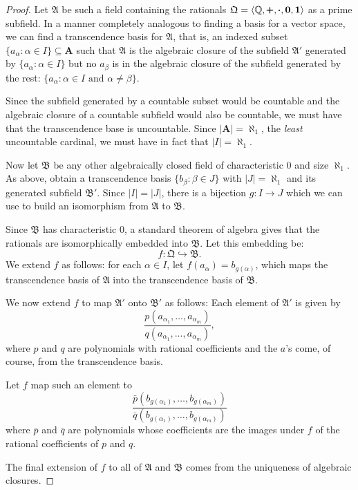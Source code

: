 \documentclass[titlepage, oneside]{amsbook}
\theoremstyle{plain}
\theoremstyle{definition}
\theoremstyle{remark}
\newcommand{\seq}{\ensuremath{\subseteq}}
\newcommand{\ma}{\ensuremath{\mathfrak{A}}}
\newcommand{\mb}{\ensuremath{\mathfrak{B}}}
\newcommand{\mq}{\ensuremath{\mathfrak{Q}}}
\newcommand{\ba}{\ensuremath{\mathbf{A}}}
\newcommand{\rat}{\ensuremath{\mathbb{Q}}}
\newcommand{\anot}[2][0]{\ensuremath{ a_{#1} , \dots , a_{#2}}}
\newcommand{\bnot}[2][0]{\ensuremath{ b_{#1} , \dots , b_{#2}}}
\begin{document}
\begin{proof}  Let $\ma$ be such a field containing the rationals $\mq
= \langle \rat , \pmb{+}, \pmb{\cdot}, \bf{0}, \bf{1} \rangle$ as a
prime subfield.  In a manner completely analogous to finding a basis
for a vector space, we can find a transcendence basis for $\ma$, that
is,  an indexed subset \\
$\{ a_\alpha : \alpha \in I \} \seq \ba$ such
that $\ma$ is the algebraic closure of the subfield $\ma'$ generated by
$\{ a_\alpha : \alpha \in I \}$ but no $a_\beta$ is in the algebraic
closure of the subfield generated by the rest: $\{ a_\alpha : \alpha
\in I \mbox{ and } \alpha \neq \beta \}$.

Since the subfield generated by a countable subset would be countable
and the algebraic closure of a countable subfield would also be
countable, we must have that the transcendence base is uncountable.
Since $|\ba| = \aleph_1$, the \emph{least} uncountable cardinal, we
must have in fact that $|I| = \aleph_1$.

Now let $\mb$ be any other algebraically closed field of characteristic
$0$ and size $\aleph_1$.  As above, obtain a transcendence basis $\{
b_\beta : \beta \in J \}$ with $|J| = \aleph_1$ and its generated
subfield $\mb'$.  Since $|I|=|J|$, there is a bijection $g: I \to
J$ which we can use to build an isomorphism from $\ma$ to $\mb$.

Since $\mb$ has characteristic $0$, a standard theorem of algebra gives
that the rationals are isomorphically
embedded into $\mb$.  Let this embedding be: \[ f : \mq
\hookrightarrow \mb .\]
We extend $f$ as follows:  for each $\alpha \in I$, let $f(a_\alpha) =
b_{g(\alpha)}$, which maps the transcendence basis of $\ma$ into the
transcendence basis of $\mb$.

We now extend $f$ to map $\ma'$ onto $\mb'$ as follows:  Each element
of $\ma'$ is given by \[
\frac{p(\anot[\alpha_1]{\alpha_m})}{q(\anot[\alpha_1]{\alpha_m})} ,\]
where $p$ and $q$ are polynomials with rational coefficients and the
$a$'s come, of course, from the transcendence basis.

Let $f$ map such an element to \[ \frac{  \bar{p} (
\bnot[g(\alpha_1)]{g (\alpha_m )})}{\bar{q}(\bnot[g (\alpha_1)]{g
(\alpha_m )})} \] where $\bar p$ and $\bar q$ are polynomials whose
coefficients are the images under $f$ of the rational coefficients of
$p$ and $q$.  


The final extension of $f$ to all of $\ma$ and $\mb$ comes from the
uniqueness of algebraic closures.

\end{proof}
\end{document}
